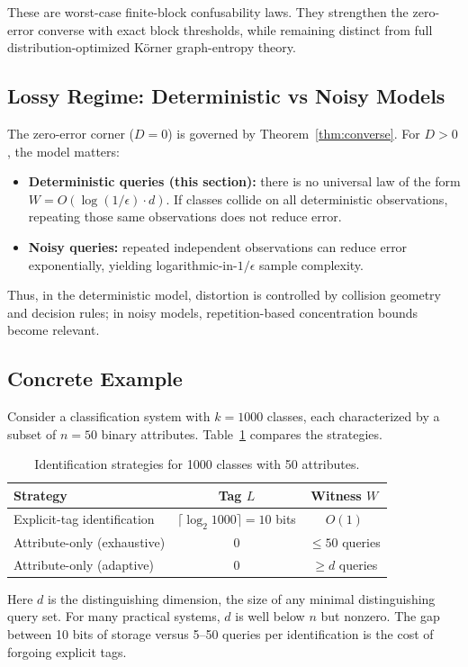 \begin{remark}[Scope]
These are worst-case finite-block confusability laws. They strengthen the zero-error converse with exact block thresholds, while remaining distinct from full distribution-optimized K\"orner graph-entropy theory.
\end{remark}

\subsection{Lossy Regime: Deterministic vs Noisy Models}

The zero-error corner ($D=0$) is governed by Theorem~\ref{thm:converse}. For $D>0$, the model matters:
\begin{itemize}
\item \textbf{Deterministic queries (this section):} there is no universal law of the form $W=O(\log(1/\epsilon)\cdot d)$. If classes collide on all deterministic observations, repeating those same observations does not reduce error.
\item \textbf{Noisy queries:} repeated independent observations can reduce error exponentially, yielding logarithmic-in-$1/\epsilon$ sample complexity.
\end{itemize}

Thus, in the deterministic model, distortion is controlled by collision geometry and decision rules; in noisy models, repetition-based concentration bounds become relevant.

\subsection{Concrete Example}

Consider a classification system with $k = 1000$ classes, each characterized by a subset of $n = 50$ binary attributes. Table~\ref{tab:strategies} compares the strategies.

\begin{table}[t]
\centering
\caption{Identification strategies for 1000 classes with 50 attributes.}
\label{tab:strategies}
\begin{tabular}{lcc}
\toprule
\textbf{Strategy} & \textbf{Tag $L$} & \textbf{Witness $W$} \\
\midrule
Explicit-tag identification & $\lceil \log_2 1000 \rceil = 10$ bits & $O(1)$ \\
Attribute-only (exhaustive) & $0$ & $\leq 50$ queries \\
Attribute-only (adaptive) & $0$ & $\geq d$ queries \\
\bottomrule
\end{tabular}
\end{table}

Here $d$ is the distinguishing dimension, the size of any minimal distinguishing query set. For many practical systems, $d$ is well below $n$ but nonzero. The gap between 10 bits of storage versus 5--50 queries per identification is the cost of forgoing explicit tags.
